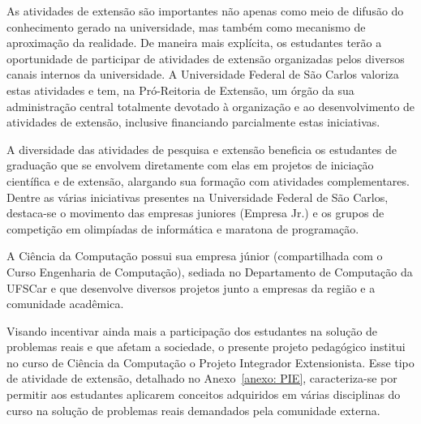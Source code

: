 As atividades de extensão são importantes não apenas como meio de difusão do conhecimento gerado na universidade, mas também como mecanismo de aproximação da realidade. De maneira mais explícita, os estudantes terão a oportunidade de participar de atividades de extensão organizadas pelos diversos canais internos da universidade. A Universidade Federal de São Carlos valoriza estas atividades e tem, na Pró-Reitoria de Extensão, um órgão da sua administração central totalmente devotado à organização e ao desenvolvimento de atividades de extensão, inclusive financiando parcialmente estas iniciativas.

A diversidade das atividades de pesquisa e extensão beneficia os estudantes de graduação que se envolvem diretamente com elas em projetos de iniciação científica e de extensão, alargando sua formação com atividades complementares. Dentre as várias iniciativas presentes na Universidade Federal de São Carlos, destaca-se o movimento das empresas juniores (Empresa Jr.) e os grupos de competição em olimpíadas de informática e maratona de programação.

A Ciência da Computação possui sua empresa júnior (compartilhada com o Curso Engenharia de Computação), sediada no Departamento de Computação da UFSCar e que desenvolve diversos projetos junto a empresas da região e a comunidade acadêmica.

Visando incentivar ainda mais a participação dos estudantes na solução de problemas reais e que afetam a sociedade, o presente projeto pedagógico institui no curso de Ciência da Computação o Projeto Integrador Extensionista. Esse tipo de atividade de extensão, detalhado no Anexo~\ref{anexo: PIE}, caracteriza-se por permitir aos estudantes aplicarem conceitos adquiridos em várias disciplinas do curso na solução de problemas reais demandados pela comunidade externa.




